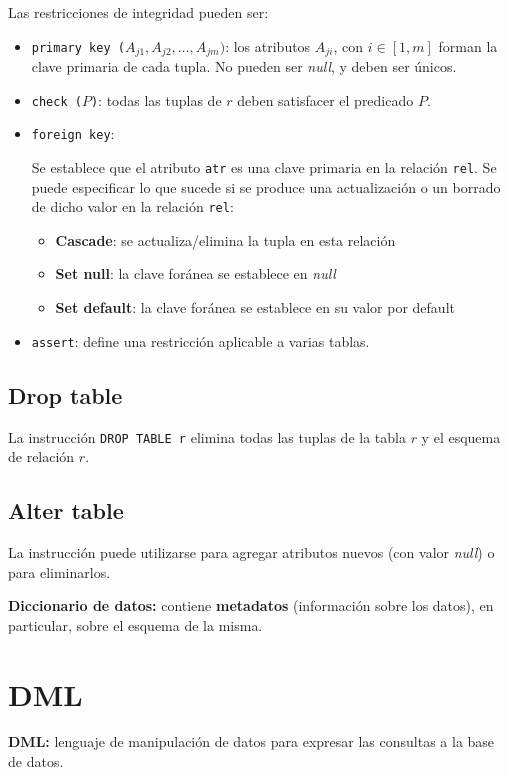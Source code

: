 \documentclass[a4paper, twoside]{article}
\newcommand{\codedir}{../resources/code} %
\begin{document}
Las restricciones de integridad pueden ser:
\begin{itemize}
	\item \texttt{primary key ($A_{j1},A_{j2},\dots,A_{jm})$}: los atributos $A_{ji}$, con $i\in[1,m]$ forman la clave primaria de cada tupla. No pueden ser \emph{null}, y deben ser únicos.
	\item \texttt{check ($P$)}: todas las tuplas de $r$ deben satisfacer el predicado $P$.
	\item \texttt{foreign key}:
	

	Se establece que el atributo \texttt{atr} es una clave primaria en la relación \texttt{rel}. Se puede especificar lo que sucede si se produce una actualización o un borrado de dicho valor en la relación \texttt{rel}:
	\begin{itemize}
		\item \textbf{Cascade}: se actualiza/elimina la tupla en esta relación
		\item \textbf{Set null}: la clave foránea se establece en \emph{null}
		\item \textbf{Set default}: la clave foránea se establece en su valor por default
	\end{itemize}

	\item \texttt{assert}: define una restricción aplicable a varias tablas.
	
\end{itemize}

\subsection{Drop table}
La instrucción \texttt{DROP TABLE r} elimina todas las tuplas de la tabla $r$ y el esquema de relación $r$.

\subsection{Alter table}
La instrucción puede utilizarse para agregar atributos nuevos (con valor \emph{null}) o para eliminarlos.



\textbf{Diccionario de datos:} contiene \textbf{metadatos} (información sobre los datos), en particular, sobre el esquema de la misma.

\section{DML}
\textbf{DML:} lenguaje de manipulación de datos para expresar las consultas a la base de datos.
\end{document}
